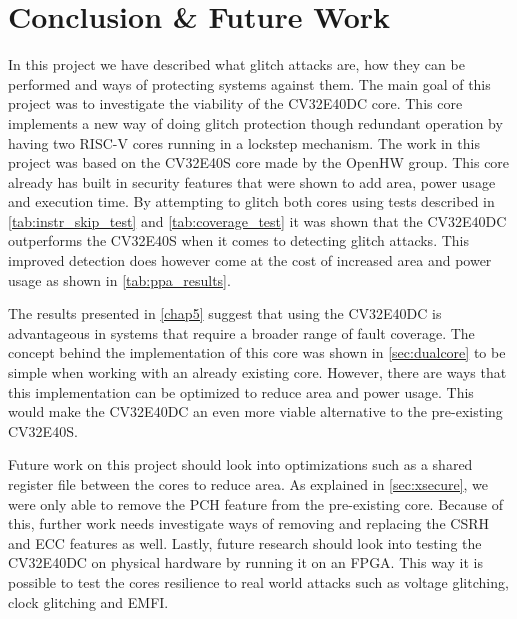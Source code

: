 \chapter{Conclusion \& Future Work}
\label{chap6}

In this project we have described what glitch attacks are, how they can be performed and ways of protecting systems against them. The main goal of this project was to investigate the viability of the CV32E40DC core. This core implements a new way of doing glitch protection though redundant operation by having two RISC-V cores running in a lockstep mechanism. The work in this project was based on the CV32E40S core\cite{cv32e40s_github} made by the OpenHW group\cite{cv32e40s_manual}. This core already has built in security features that were shown to add area, power usage and execution time. By attempting to glitch both cores using tests described in \autoref{tab:instr_skip_test} and \autoref{tab:coverage_test} it was shown that the CV32E40DC outperforms the CV32E40S when it comes to detecting glitch attacks. This improved detection does however come at the cost of increased area and power usage as shown in \autoref{tab:ppa_results}. 

The results presented in \autoref{chap5} suggest that using the CV32E40DC is advantageous in systems that require a broader range of fault coverage. The concept behind the implementation of this core was shown in \autoref{sec:dualcore} to be simple when working with an already existing core. However, there are ways that this implementation can be optimized to reduce area and power usage. This would make the CV32E40DC an even more viable alternative to the pre-existing CV32E40S. 

Future work on this project should look into optimizations such as a shared register file between the cores to reduce area. As explained in \autoref{sec:xsecure}, we were only able to remove the PCH feature from the pre-existing core. Because of this, further work needs investigate ways of removing and replacing the CSRH and ECC features as well. Lastly, future research should look into testing the CV32E40DC on physical hardware by running it on an FPGA. This way it is possible to test the cores resilience to real world attacks such as voltage glitching, clock glitching and EMFI. 